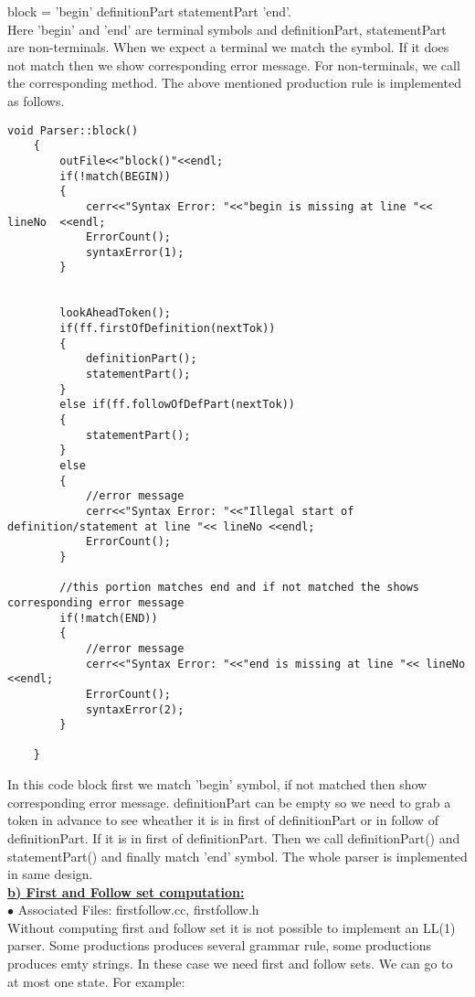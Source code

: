 \documentclass[paper=letter, fontsize=11pt]{scrartcl} %
\begin{document}
block = 'begin' definitionPart statementPart 'end'.\\

Here 'begin' and 'end' are terminal symbols and definitionPart, statementPart are non-terminals. When we expect a terminal we match the symbol. If it does not match then we show corresponding error message. For non-terminals, we call the corresponding method. The above mentioned production rule is implemented as follows.

\begin{lstlisting}
void Parser::block()
	{
		outFile<<"block()"<<endl;
		if(!match(BEGIN))
		{
			cerr<<"Syntax Error: "<<"begin is missing at line "<< lineNo  <<endl;
			ErrorCount();
			syntaxError(1);
		}
			

		lookAheadToken();
		if(ff.firstOfDefinition(nextTok))
		{	
			definitionPart();
			statementPart();
		}
		else if(ff.followOfDefPart(nextTok))
		{
			statementPart();
		}
		else
		{
			//error message
			cerr<<"Syntax Error: "<<"Illegal start of definition/statement at line "<< lineNo <<endl;
			ErrorCount();
		}

		//this portion matches end and if not matched the shows corresponding error message
		if(!match(END))
		{
			//error message		
			cerr<<"Syntax Error: "<<"end is missing at line "<< lineNo <<endl;
			ErrorCount();
			syntaxError(2);
		}	
	
	}  	  	 
\end{lstlisting}

In this code block first we match 'begin' symbol, if not matched then show corresponding error message. definitionPart can be empty so we need to grab a token in advance to see wheather it is in first of definitionPart or in follow of definitionPart. If it is in first of definitionPart. Then we call definitionPart() and statementPart() and finally match 'end' symbol. The whole parser is implemented in same design. \\

\underline {\bf b) First and Follow set computation:}\\

$\bullet$ Associated Files: firstfollow.cc, firstfollow.h\\
Without computing first and follow set it is not possible to implement an LL(1) parser. Some productions produces several grammar rule, some productions produces emty strings. In these case we need first and follow sets. We can go to at most one state. For example:\\
\end{document}
